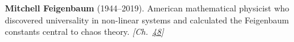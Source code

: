 \textbf{Mitchell Feigenbaum} (1944–2019). American mathematical physicist who discovered universality in non-linear systems and calculated the Feigenbaum constants central to chaos theory. \emph{[Ch.~\hyperref[ch:threebody]{48}]}

